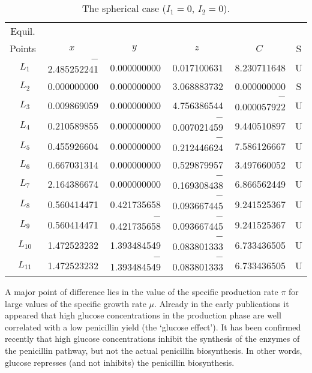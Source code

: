 \documentclass{kluwer}    %
\begin{document}
\begin{article}
\begin{table*}
\caption[]{The spherical case ($I_1=0$, $I_2=0$).}
\label{sphericcase}
\begin{tabular}{crrrrc}
\hline
Equil. \\
Points & \multicolumn{1}{c}{$x$} & \multicolumn{1}{c}{$y$} & \multicolumn{1}{c}{$z$} & \multicolumn{1}{c}{$C$} &
S \\
\hline
$~~L_1$ & $-$2.485252241 & 0.000000000 & 0.017100631 & 8.230711648 & U \\
$~~L_2$ &    0.000000000 & 0.000000000 & 3.068883732 & 0.000000000 & S \\
$~~L_3$ &    0.009869059 & 0.000000000 & 4.756386544 & $-$0.000057922 & U \\
$~~L_4$ &    0.210589855 & 0.000000000 & $-$0.007021459 & 9.440510897 & U \\
$~~L_5$ &    0.455926604 & 0.000000000 & $-$0.212446624 & 7.586126667 & U \\
$~~L_6$ &    0.667031314 & 0.000000000 & 0.529879957 & 3.497660052 & U \\
$~~L_7$ &    2.164386674 & 0.000000000 & $-$0.169308438 & 6.866562449 & U \\
$~~L_8$ &    0.560414471 & 0.421735658 & $-$0.093667445 & 9.241525367 & U \\
$~~L_9$ &    0.560414471 & $-$0.421735658 & $-$0.093667445 & 9.241525367 & U
\\
$~~L_{10}$ & 1.472523232 & 1.393484549 & $-$0.083801333 & 6.733436505 & U \\
$~~L_{11}$ & 1.472523232 & $-$1.393484549 & $-$0.083801333 & 6.733436505 & U
\\ \hline
\end{tabular}
\end{table*}


A major
point of difference lies in the value of the specific production rate $\pi$ for
large values of the specific growth rate $\mu$.
Already in the early publications \cite{Falzon87}
it appeared that high glucose
concentrations in the production phase are well correlated with a
low penicillin yield (the 
`glucose effect'). It has been confirmed recently 
\cite{Bunt,Cahour-thesis,BrownAndBurton,Carr-Goldstein}
that
high glucose concentrations inhibit the synthesis of the enzymes of the
penicillin pathway, but not the actual penicillin biosynthesis.
In other words, glucose represses (and not inhibits) the penicillin
biosynthesis. 


\end{article}
\end{document}
